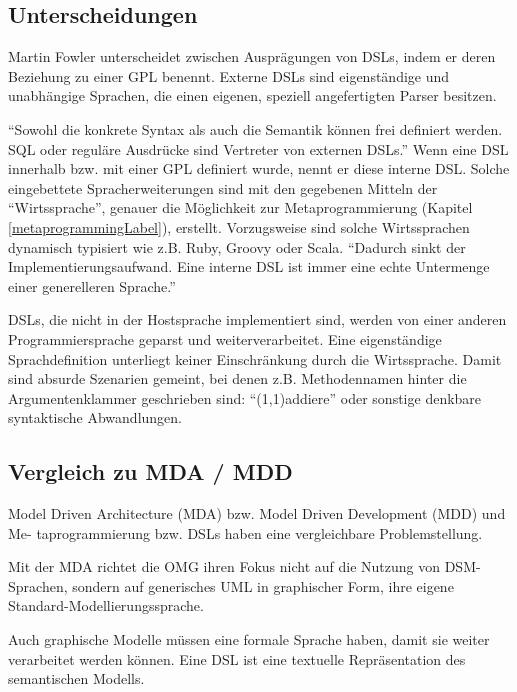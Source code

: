 \documentclass[11pt,english,ngerman, headsepline]{scrreprt}
\begin{document}

 


\subsection{Unterscheidungen}

Martin Fowler unterscheidet zwischen Ausprägungen von DSLs, indem er deren
Beziehung zu einer GPL benennt. Externe DSLs sind eigenständige und unabhängige
Sprachen, die einen eigenen, speziell angefertigten Parser besitzen. 

``Sowohl die konkrete Syntax als auch die Semantik können frei definiert
werden. SQL oder reguläre Ausdrücke sind Vertreter von externen DSLs.''
\cite{wikidsl} Wenn eine DSL innerhalb bzw.
mit einer GPL definiert wurde, nennt er diese interne DSL. Solche eingebettete
Spracherweiterungen sind mit den gegebenen Mitteln der ``Wirtssprache'',
genauer die Möglichkeit zur Metaprogrammierung (Kapitel
\ref{metaprogrammingLabel}), erstellt.
Vorzugsweise sind solche Wirtssprachen dynamisch typisiert wie z.B. Ruby, Groovy
oder Scala. 
``Dadurch sinkt der Implementierungsaufwand. Eine interne DSL ist immer eine echte
Untermenge einer generelleren Sprache.'' \cite{wikidsl}

DSLs, die nicht in der Hostsprache implementiert sind, werden von einer anderen
Programmiersprache geparst und weiterverarbeitet. Eine eigenständige
Sprachdefinition unterliegt keiner Einschränkung durch die Wirtssprache.
Damit sind absurde Szenarien gemeint, bei denen z.B. Methodennamen hinter die
Argumentenklammer geschrieben sind: ``(1,1)addiere'' oder sonstige denkbare
syntaktische Abwandlungen.


\subsection{Vergleich zu MDA / MDD } 


Model Driven Architecture (MDA) bzw. Model Driven Development (MDD) und Me-
taprogrammierung bzw. DSLs haben eine vergleichbare Problemstellung.
 

Mit der MDA richtet die OMG ihren Fokus nicht auf die Nutzung
von DSM-Sprachen, sondern auf generisches UML in graphischer Form,
ihre eigene Standard-Modellierungssprache.

Auch graphische Modelle müssen eine formale Sprache haben, damit sie weiter 
verarbeitet werden können.  Eine DSL ist eine textuelle Repräsentation des 
semantischen Modells.
 
\end{document}
